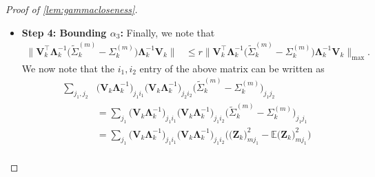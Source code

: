 \documentclass[10pt]{article}
\newcommand{\0}{{\mathbf{0}}}
\newcommand{\1}{{\mathbf{1}}}
\newcommand{\E}{{\mathbf{E}}}
\renewcommand{\t}{^{\top}}
\newcommand{\inv}{^{-1}}
\renewcommand{\E}{\mathbb{E}}
\renewcommand{\tilde}{\widetilde}
\renewcommand{\hat}{\widehat}
\renewcommand{\hat}{\widehat}
\begin{document}
\begin{proof}[Proof of \cref{lem:gammacloseness}]
\begin{itemize}
\begin{align}
    &\quad + \frac{\sigma^2 \log(p)}{\lambda} \|  \mathbf{V}_k \mathbf{\Lambda}_k\inv - \mathbf{\hat V}_k \mathbf{\hat{\Lambda}}_k\inv \mathbf{\hat W}_k\t \| \label{zhatminusz2} \\
    &\lesssim  \frac{1}{\lambda^2} \bigg( \frac{\sigma^{2} \kappa \mu_{0} \sqrt{r} \log (p)}{p}+\frac{\sigma^{3} \mu_{0}^{4} \kappa^{3} r^{3} \log ^{3 / 2}(p)}{\lambda \sqrt{p}} \bigg) \nonumber \\
    &\quad + \frac{\sigma^2 \log(p)}{\lambda} \bigg( \frac{\sigma r \sqrt{p}+\kappa^{2} \sigma \sqrt{r p \log (p)}}{\lambda^{2}}\bigg) \label{vhatminusv4} \\
    &\asymp \frac{\sigma^3 r \sqrt{p} \log(p) + \sigma^3 \kappa^2 \sqrt{rp} \log^{3/2}(p)}{\lambda^3} + \frac{\sigma^2 \kappa \mu_0 \sqrt{r} \log(p)}{\lambda^2 p} \label{alpha2bound}
\end{align}
where \eqref{zhatminusz} follows from \eqref{sigmahatminussigmatilde},  \eqref{zhatminusz2} follows from \eqref{sigmahatbound}, and \eqref{vhatminusv4} follows from \eqref{vhatminusv2}. We note that \eqref{alpha2bound} follows since
\begin{align*}
    \frac{\sigma^3 \mu_0^4 \kappa^3 r^3 \log^{3/2}(p)}{\lambda^3 \sqrt{p}} \lesssim \frac{\sigma^3 \kappa^2 \sqrt{rp} \log^{3/2}(p)}{\lambda^3},
\end{align*}
which holds on the assumption $\kappa^2 \mu_0^2 r^{3/2} \sqrt{\log(p)} \lesssim p^{1/4}$. 
\item 
\textbf{Step 4: Bounding $\alpha_3$:} Finally, we note that
\begin{align*}
    \| \mathbf{V}_k\t \mathbf{\Lambda}_k\inv \bigg( \tilde \Sigma^{(m)}_k - \Sigma^{(m)}_k \bigg) \mathbf{\Lambda}_k\inv \mathbf{V}_k \| &\leq r  \| \mathbf{V}_k\t \mathbf{\Lambda}_k\inv \bigg( \tilde \Sigma^{(m)}_k - \Sigma^{(m)}_k \bigg) \mathbf{\Lambda}_k\inv \mathbf{V}_k \|_{\max}.
\end{align*}
We now note that the $i_1,i_2$ entry of the above matrix can be written as
\begin{align*}
    \sum_{j_1,j_2} &\big( \mathbf{V}_k \mathbf{\Lambda}_k\inv \big)_{j_1 i_1} \big( \mathbf{V}_k \mathbf{\Lambda}_k\inv\big)_{j_2 i_2} \bigg( \tilde \Sigma^{(m)}_k - \Sigma^{(m)}_k \bigg)_{j_1 j_2}\\
    &= \sum_{j_1}\big( \mathbf{V}_k \mathbf{\Lambda}_k\inv \big)_{j_1 i_1} \big( \mathbf{V}_k \mathbf{\Lambda}_k\inv\big)_{j_1 i_2} \bigg( \tilde \Sigma^{(m)}_k - \Sigma^{(m)}_k \bigg)_{j_1 j_1} \\
    &= \sum_{j_1}\big( \mathbf{V}_k \mathbf{\Lambda}_k\inv \big)_{j_1 i_1} \big( \mathbf{V}_k \mathbf{\Lambda}_k\inv\big)_{j_1 i_2} \bigg(\big( \mathbf{Z}_k\big)_{mj_1}^2 - \E \big( \mathbf{Z}_k\big)_{mj_1}^2 \bigg) \\

\end{align*}
\end{itemize}
\end{proof}
\end{document}
